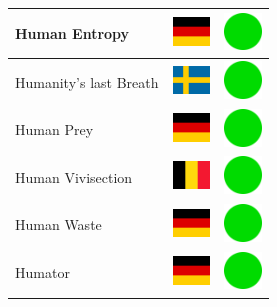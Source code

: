 \documentclass[12pt, a4paper, twoside]{report}
\begin{document}
\begin{center}
\begin{longtable}{|p{5cm}|p{2cm}|p{2cm}|}
 Human Entropy                                              & \includegraphics[width=1cm]{../4x3/de} &   \includegraphics[width=1cm]{../likes/y} \\ \hline
 Humanity's last Breath                                     & \includegraphics[width=1cm]{../4x3/se} &   \includegraphics[width=1cm]{../likes/y} \\ \hline
 Human Prey                                                 & \includegraphics[width=1cm]{../4x3/de} &   \includegraphics[width=1cm]{../likes/y} \\ \hline
 Human Vivisection                                          & \includegraphics[width=1cm]{../4x3/be} &   \includegraphics[width=1cm]{../likes/y} \\ \hline
 Human Waste                                                & \includegraphics[width=1cm]{../4x3/de} &   \includegraphics[width=1cm]{../likes/y} \\ \hline
 Humator                                                    & \includegraphics[width=1cm]{../4x3/de} &   \includegraphics[width=1cm]{../likes/y} \\ \hline

\end{longtable}
\end{center}
\end{document}
